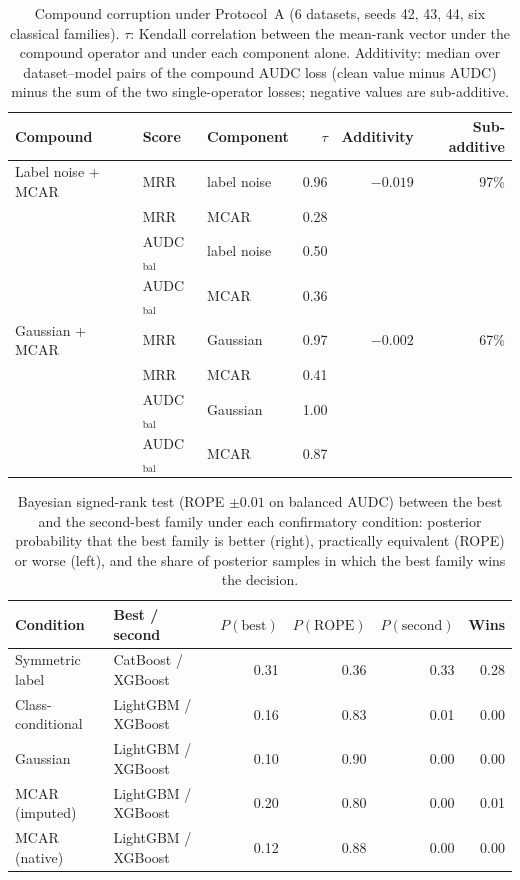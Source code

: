 \documentclass[pdflatex,sn-mathphys]{sn-jnl}
\theoremstyle{thmstyleone}
\begin{document}
\begin{table}[t]
\centering
\footnotesize
\caption{Compound corruption under Protocol~A (6 datasets, seeds 42, 43, 44, six classical families). $\tau$: Kendall correlation between the mean-rank vector under the compound operator and under each component alone. Additivity: median over dataset--model pairs of the compound AUDC loss (clean value minus AUDC) minus the sum of the two single-operator losses; negative values are sub-additive.}
\label{tab:sens_compound}
\begin{tabular}{@{}lllrrr@{}}
\toprule
Compound & Score & Component & $\tau$ & Additivity & Sub-additive \\
\midrule
Label noise + MCAR & MRR & label noise & 0.96 & $-0.019$ & 97\% \\
 & MRR & MCAR & 0.28 &  &  \\
 & AUDC$_{\mathrm{bal}}$ & label noise & 0.50 &  &  \\
 & AUDC$_{\mathrm{bal}}$ & MCAR & 0.36 &  &  \\
\midrule
Gaussian + MCAR & MRR & Gaussian & 0.97 & $-0.002$ & 67\% \\
 & MRR & MCAR & 0.41 &  &  \\
 & AUDC$_{\mathrm{bal}}$ & Gaussian & 1.00 &  &  \\
 & AUDC$_{\mathrm{bal}}$ & MCAR & 0.87 &  &  \\
\bottomrule
\end{tabular}
\end{table}

\begin{table}[t]
\centering
\footnotesize
\caption{Bayesian signed-rank test (ROPE $\pm0.01$ on balanced AUDC) between the best and the second-best family under each confirmatory condition: posterior probability that the best family is better (right), practically equivalent (ROPE) or worse (left), and the share of posterior samples in which the best family wins the decision.}
\label{tab:sens_bayes}
\begin{tabular}{@{}llrrrr@{}}
\toprule
Condition & Best / second & $P(\mathrm{best})$ & $P(\mathrm{ROPE})$ & $P(\mathrm{second})$ & Wins \\
\midrule
Symmetric label & CatBoost / XGBoost & 0.31 & 0.36 & 0.33 & 0.28 \\
Class-conditional & LightGBM / XGBoost & 0.16 & 0.83 & 0.01 & 0.00 \\
Gaussian & LightGBM / XGBoost & 0.10 & 0.90 & 0.00 & 0.00 \\
MCAR (imputed) & LightGBM / XGBoost & 0.20 & 0.80 & 0.00 & 0.01 \\
MCAR (native) & LightGBM / XGBoost & 0.12 & 0.88 & 0.00 & 0.00 \\
\bottomrule
\end{tabular}
\end{table}
\end{document}

